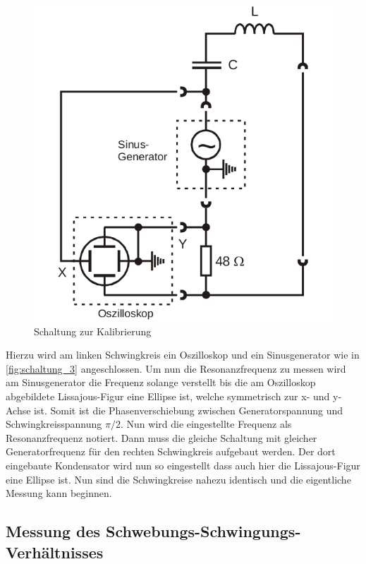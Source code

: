 \begin{figure}
    \centering
    \includegraphics[width=\textwidth/3]{images/schaltung_3.png}
    \caption{Schaltung zur Kalibrierung\cite{V355}}
    \label{fig:schaltung_3}
\end{figure}
Hierzu wird am linken Schwingkreis ein Oszilloskop und ein Sinusgenerator wie in \autoref{fig:schaltung_3} angeschlossen. 
Um nun die Resonanzfrequenz zu messen wird am Sinusgenerator die Frequenz solange verstellt bis die am Oszilloskop abgebildete Lissajous-Figur eine Ellipse ist, welche symmetrisch zur x- und y-Achse ist. Somit ist die Phasenverschiebung zwischen Generatorspannung und Schwingkreisspannung $\pi/2$. 
Nun wird die eingestellte Frequenz als Resonanzfrequenz notiert.
Dann muss die gleiche Schaltung mit gleicher Generatorfrequenz für den rechten Schwingkreis aufgebaut werden.
Der dort eingebaute Kondensator wird nun so eingestellt dass auch hier die Lissajous-Figur eine Ellipse ist. Nun sind die Schwingkreise nahezu identisch und die eigentliche Messung kann beginnen.

\subsection{Messung des Schwebungs-Schwingungs-Verhältnisses}
\label{sec:schwebung}

